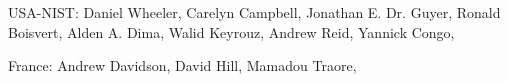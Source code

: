 USA-NIST: 
Daniel Wheeler, 
Carelyn Campbell, 
Jonathan E. Dr. Guyer, 
Ronald Boisvert,
Alden A. Dima,
Walid Keyrouz, 
Andrew Reid, 
Yannick Congo, 

France:
Andrew Davidson,
David Hill,
Mamadou Traore,